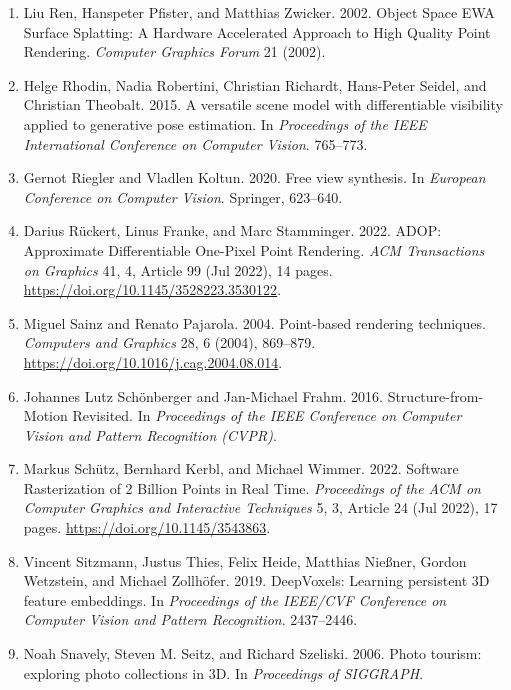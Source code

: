 \begin{enumerate}[leftmargin=2em, itemsep=0.3em, topsep=0.4em, parsep=0pt]
    \item Liu Ren, Hanspeter Pfister, and Matthias Zwicker. 2002. Object Space EWA Surface Splatting: A Hardware Accelerated Approach to High Quality Point Rendering. \textit{Computer Graphics Forum} 21 (2002).

    \item Helge Rhodin, Nadia Robertini, Christian Richardt, Hans-Peter Seidel, and Christian Theobalt. 2015. A versatile scene model with differentiable visibility applied to generative pose estimation. In \textit{Proceedings of the IEEE International Conference on Computer Vision}. 765--773.

    \item Gernot Riegler and Vladlen Koltun. 2020. Free view synthesis. In \textit{European Conference on Computer Vision}. Springer, 623--640.

    \item Darius R{\"u}ckert, Linus Franke, and Marc Stamminger. 2022. ADOP: Approximate Differentiable One-Pixel Point Rendering. \textit{ACM Transactions on Graphics} 41, 4, Article 99 (Jul 2022), 14 pages. \url{https://doi.org/10.1145/3528223.3530122}.

    \item Miguel Sainz and Renato Pajarola. 2004. Point-based rendering techniques. \textit{Computers and Graphics} 28, 6 (2004), 869--879. \url{https://doi.org/10.1016/j.cag.2004.08.014}.

    \item Johannes Lutz Sch{\"o}nberger and Jan-Michael Frahm. 2016. Structure-from-Motion Revisited. In \textit{Proceedings of the IEEE Conference on Computer Vision and Pattern Recognition (CVPR)}.

    \item Markus Sch{\"u}tz, Bernhard Kerbl, and Michael Wimmer. 2022. Software Rasterization of 2 Billion Points in Real Time. \textit{Proceedings of the ACM on Computer Graphics and Interactive Techniques} 5, 3, Article 24 (Jul 2022), 17 pages. \url{https://doi.org/10.1145/3543863}.

    \item Vincent Sitzmann, Justus Thies, Felix Heide, Matthias Nie{\ss}ner, Gordon Wetzstein, and Michael Zollh{\"o}fer. 2019. DeepVoxels: Learning persistent 3D feature embeddings. In \textit{Proceedings of the IEEE/CVF Conference on Computer Vision and Pattern Recognition}. 2437--2446.

    \item Noah Snavely, Steven M. Seitz, and Richard Szeliski. 2006. Photo tourism: exploring photo collections in 3D. In \textit{Proceedings of SIGGRAPH}.


\end{enumerate}
